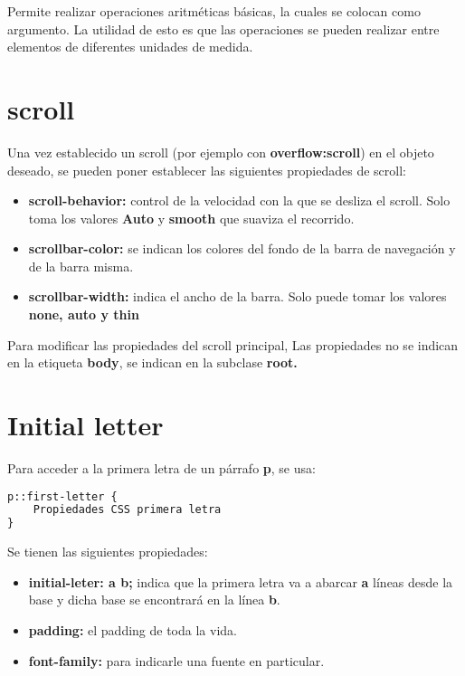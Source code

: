\documentclass[10pt,oneside]{article}
\begin{document}
\begin{multicols}{2}
    Permite realizar operaciones aritméticas básicas, la cuales se colocan como argumento. La utilidad de esto es que las operaciones se pueden realizar entre elementos de diferentes unidades de medida.

\section{scroll}

    Una vez establecido un scroll (por ejemplo con \textbf{overflow:scroll}) en el objeto deseado, se pueden poner establecer las siguientes propiedades de scroll:

    \begin{itemize}
        \item \textbf{scroll-behavior:} control de la velocidad con la que se desliza el scroll. Solo toma los valores  \textbf{Auto} y \textbf{smooth} que suaviza el recorrido.
        \item \textbf{scrollbar-color:} se indican los colores del fondo de la barra de navegación y de la barra misma.
        \item \textbf{scrollbar-width:} indica el ancho de la barra. Solo puede tomar los valores \textbf{none, auto y thin}
    \end{itemize}

    Para modificar las propiedades del scroll principal, Las propiedades no se indican en la etiqueta \textbf{body}, se indican en la subclase \textbf{root.}

\section{Initial letter}

    Para acceder a la primera letra de un párrafo \textbf{p}, se usa:

    \begin{lstlisting}[language=HTML]
p::first-letter {
    Propiedades CSS primera letra
}
    \end{lstlisting}

    Se tienen las siguientes propiedades:
    \begin{itemize}
        \item \textbf{initial-leter: a b;} indica que la primera letra va a abarcar \textbf{a} líneas desde la base y dicha base se encontrará en la línea \textbf{b}.
        \item \textbf{padding:} el padding de toda la vida.
        \item \textbf{font-family:} para indicarle una fuente en particular.
    \end{itemize}
    

\end{multicols}
\end{document}
